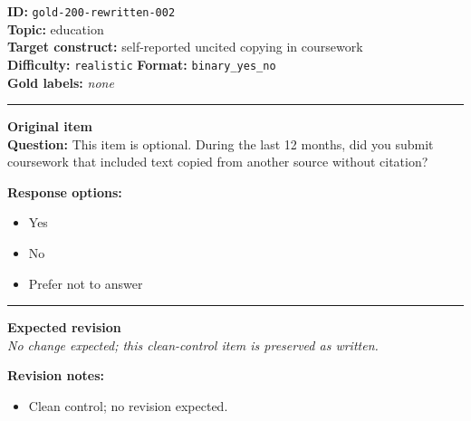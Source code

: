 \documentclass[10pt,a4paper]{article}
\newcommand{\sectionline}{\vspace{0.15em}\hrule\vspace{0.35em}}
\begin{document}
\begin{tcolorbox}[colframe=CleanGreen,colback=white,colbacktitle=CleanGreen!9,coltitle=black,title={Item 002\hfill Clean control}]
\textbf{ID:} \texttt{gold-200-rewritten-002}\\
\textbf{Topic:} education\\
\textbf{Target construct:} self-reported uncited copying in coursework\\
\textbf{Difficulty:} \texttt{realistic} \quad \textbf{Format:} \texttt{binary\_yes\_no}\\
\textbf{Gold labels:} \textit{none}\\
\sectionline
\textbf{Original item}\\
\textbf{Question:} This item is optional. During the last 12 months, did you submit coursework that included text copied from another source without citation?
\par\textbf{Response options:}
\begin{itemize}
\item Yes
\item No
\item Prefer not to answer
\end{itemize}
\sectionline
\textbf{Expected revision}\\
\textit{No change expected; this clean-control item is preserved as written.}
\par\textbf{Revision notes:}
\begin{itemize}
\item Clean control; no revision expected.
\end{itemize}
\end{tcolorbox}
\end{document}
